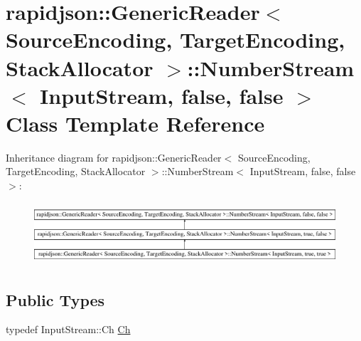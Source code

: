 \hypertarget{classrapidjson_1_1_generic_reader_1_1_number_stream_3_01_input_stream_00_01false_00_01false_01_4}{}\section{rapidjson\+::Generic\+Reader$<$ Source\+Encoding, Target\+Encoding, Stack\+Allocator $>$\+::Number\+Stream$<$ Input\+Stream, false, false $>$ Class Template Reference}
\label{classrapidjson_1_1_generic_reader_1_1_number_stream_3_01_input_stream_00_01false_00_01false_01_4}
Inheritance diagram for rapidjson\+::Generic\+Reader$<$ Source\+Encoding, Target\+Encoding, Stack\+Allocator $>$\+::Number\+Stream$<$ Input\+Stream, false, false $>$\+:\begin{figure}[H]
\begin{center}
\leavevmode
\includegraphics[height=2.326870cm]{classrapidjson_1_1_generic_reader_1_1_number_stream_3_01_input_stream_00_01false_00_01false_01_4}
\end{center}
\end{figure}
\subsection*{Public Types}
\begin{DoxyCompactItemize}
\item 
typedef Input\+Stream\+::\+Ch \mbox{\hyperlink{classrapidjson_1_1_generic_reader_1_1_number_stream_3_01_input_stream_00_01false_00_01false_01_4_a2a945ef08d04099027c32f72821a12c0}{Ch}}
\end{DoxyCompactItemize}
